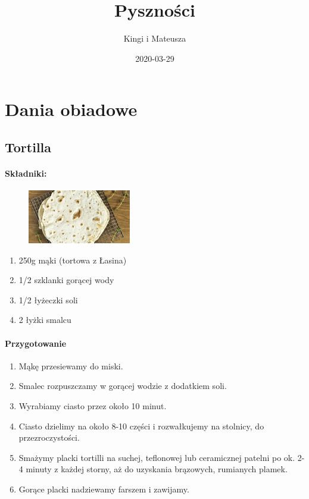 \documentclass{article}
\title{Pyszności}
\author{Kingi i Mateusza}
\date{2020-03-29}
\begin{document}
    \maketitle
    \newpage

    \section{Dania obiadowe}
    \medskip
    \subsection{Tortilla}
    \bigskip
    \paragraph{Składniki:}
    \begin{figure}
        \includegraphics[width=0.4\textwidth]{tortilla.jpg}
    \end{figure}
    \begin{enumerate}
        \item 250g mąki (tortowa z Łasina)
        \item 1/2 szklanki gorącej wody
        \item 1/2 łyżeczki soli
        \item 2 łyżki smalcu
    \end{enumerate}

    \paragraph{Przygotowanie}
    \begin{enumerate}
        \item Mąkę przesiewamy do miski.
        \item Smalec rozpuszczamy w gorącej wodzie z dodatkiem soli.
        \item Wyrabiamy ciasto przez około 10 minut.
        \item Ciasto dzielimy na około 8-10 części i rozwałkujemy na stolnicy,
            do przezroczystości.
        \item Smażymy placki tortilli na suchej, teflonowej lub ceramicznej
            patelni po ok. 2-4 minuty z każdej storny, aż do uzyskania
            brązowych, rumianych plamek.
        \item Gorące placki nadziewamy farszem i zawijamy.
    \end{enumerate}
\end{document}
